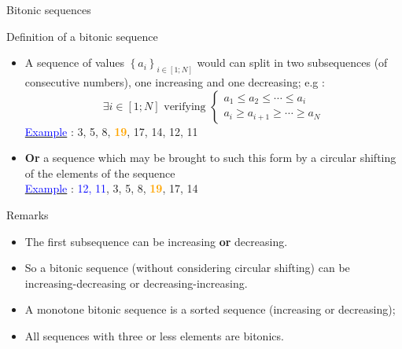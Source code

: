 \documentclass[compress,10pt,aspectratio=169]{beamer}
\begin{document}
\begin{frame}[fragile]{Bitonic sequences}
    \scriptsize
    \begin{alertblock}{\small Definition of a bitonic sequence}
        \begin{itemize}
        \item A sequence of values $\left\{a_{i}\right\}_{i\in[1;N]}$ would can split in two subsequences (of consecutive numbers), one increasing and one decreasing; e.g :
        \[
            \exists i\in\left[1;N\right] \mbox{ verifying } 
            \left\{
            \begin{array}{l}
                a_{1} \leq a_{2} \leq \cdots \leq a_{i} \\
                a_{i} \geq a_{i+1} \geq \cdots \geq a_{N}
            \end{array}
            \right.
        \]
        \underline{\textcolor{blue}{Example}} : 3, 5, 8, \textcolor{orange}{\textbf{19}}, 17, 14, 12, 11

        \item \textbf{Or} a sequence which may be brought to such this form by a circular shifting of the elements of the sequence \\[2mm]
        \underline{\textcolor{blue}{Example}} : \textcolor{blue}{12, 11}, 3, 5, 8, \textcolor{orange}{\textbf{19}}, 17, 14
        \end{itemize}
    \end{alertblock}

    \begin{exampleblock}{\small Remarks}
        \begin{itemize}
            \item The first subsequence can be increasing \textbf{or} decreasing.
            \item So a bitonic sequence (without considering circular shifting) can be increasing-decreasing or
                  decreasing-increasing.
            \item A monotone bitonic sequence is a sorted sequence (increasing or decreasing);
            \item All sequences with three or less elements are bitonics.
        \end{itemize}
    \end{exampleblock}
\end{frame}
\end{document}
